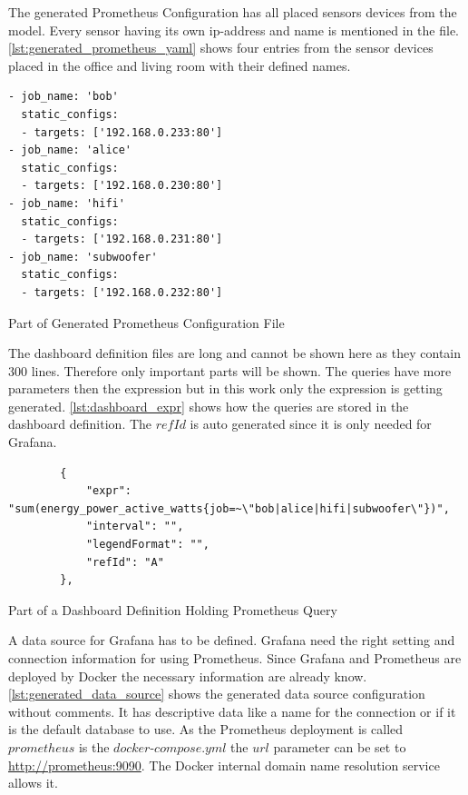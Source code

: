 The generated Prometheus Configuration has all placed sensors devices from the model. Every sensor having its own \gls{ip-address} and name is mentioned in the file. \cref{lst:generated_prometheus_yaml} shows four entries from the sensor devices placed in the office and living room with their defined names.

\begin{listing}[!ht]
	\begin{verbatim}
- job_name: 'bob'
  static_configs:
  - targets: ['192.168.0.233:80']
- job_name: 'alice'
  static_configs:
  - targets: ['192.168.0.230:80']
- job_name: 'hifi'
  static_configs:
  - targets: ['192.168.0.231:80']
- job_name: 'subwoofer'
  static_configs:
  - targets: ['192.168.0.232:80']
	\end{verbatim}
	\caption{Part of Generated Prometheus Configuration File}
	\label{lst:generated_prometheus_yaml}
\end{listing}

The dashboard definition files are long and cannot be shown here as they contain 300 lines. Therefore only important parts will be shown. The queries have more parameters then the expression but in this work only the expression is getting generated. \cref{lst:dashboard_expr} shows how the queries are stored in the dashboard definition. The $refId$ is auto generated since it is only needed for Grafana.

\begin{listing}[!ht]
	\begin{verbatim}
		{
			"expr": "sum(energy_power_active_watts{job=~\"bob|alice|hifi|subwoofer\"})",
			"interval": "",
			"legendFormat": "",
			"refId": "A" 
		},
	\end{verbatim}
	\caption{Part of a Dashboard Definition Holding Prometheus Query}
	\label{lst:dashboard_expr}
\end{listing}

A data source for Grafana has to be defined. Grafana need the right setting and connection information for using Prometheus. Since Grafana and Prometheus are deployed by Docker the necessary information are already know. \cref{lst:generated_data_source} shows the generated data source configuration without comments. It has descriptive data like a name for the connection or if it is the default database to use. As the Prometheus deployment is called $prometheus$ is the $docker\text{-}compose.yml$ the $url$ parameter can be set to \url{http://prometheus:9090}. The Docker internal domain name resolution service allows it.

